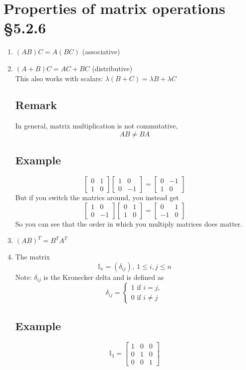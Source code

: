 \documentclass[11pt]{article}
\begin{document}
\section{Properties of matrix operations §5.2.6}
\begin{enumerate}[ (i) ]
\item $(AB)C = A(BC)$ (associative)
\item $(A + B)C = AC + BC$ (distributive)\\
This also works with scalars: $\lambda(B + C) = \lambda B + \lambda C$

\subsection{Remark}
In general, matrix multiplication is not commutative,
\[ AB \not = BA \]

\subsection{Example}
\[
\begin{bmatrix}
0 & 1 \\
1 & 0
\end{bmatrix}
\begin{bmatrix}
1 & 0 \\
0 & -1
\end{bmatrix}
= \begin{bmatrix}
0 & -1 \\
1 & 0
\end{bmatrix}
\]
But if you switch the matrics around, you instead get
\[
\begin{bmatrix}
1 & 0 \\
0 & -1
\end{bmatrix}
\begin{bmatrix}
0 & 1 \\
1 & 0
\end{bmatrix}
= \begin{bmatrix}
0 & 1 \\
-1 & 0
\end{bmatrix}
\]
So you can see that the order in which you multiply matrices does matter.

\item $(AB)^T = B^T A^T$

\item The matrix
\[ \mathbb{I}_n = (\delta_{ij}),\ 1 \leq i, j \leq n \]
Note: $\delta_{ij}$ is the Kronecker delta and is defined as
\[ \delta_{ij} = \begin{cases}
  1 \text{ if } i = j, \\
  0 \text{ if } i \not = j
\end{cases}
\]

\subsection{Example}
\[ \mathbb{I}_3 = \begin{bmatrix}
1 & 0 & 0 \\
0 & 1 & 0 \\
0 & 0 & 1
\end{bmatrix}
\]
\end{enumerate}
\end{document}
